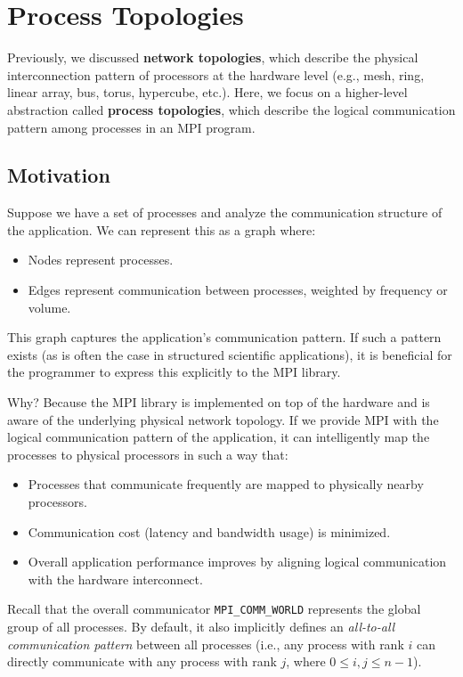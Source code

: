 \documentclass[12pt]{book}
\begin{document}
\section{Process Topologies}

Previously, we discussed \textbf{network topologies}, which describe the physical interconnection pattern of processors at the hardware level (e.g., mesh, ring, linear array, bus, torus, hypercube, etc.).  
Here, we focus on a higher-level abstraction called \textbf{process topologies}, which describe the logical communication pattern among processes in an MPI program.

\subsection{Motivation}
Suppose we have a set of processes and analyze the communication structure of the application. We can represent this as a graph where:
\begin{itemize}
    \item Nodes represent processes.
    \item Edges represent communication between processes, weighted by frequency or volume.
\end{itemize}

This graph captures the application's communication pattern. If such a pattern exists (as is often the case in structured scientific applications), it is beneficial for the programmer to express this explicitly to the MPI library.

Why? Because the MPI library is implemented on top of the hardware and is aware of the underlying physical network topology. If we provide MPI with the logical communication pattern of the application, it can intelligently map the processes to physical processors in such a way that:
\begin{itemize}
    \item Processes that communicate frequently are mapped to physically nearby processors.
    \item Communication cost (latency and bandwidth usage) is minimized.
    \item Overall application performance improves by aligning logical communication with the hardware interconnect.
\end{itemize}

Recall that the overall communicator \texttt{MPI\_COMM\_WORLD} represents the global group of all processes. By default, it also implicitly defines an \emph{all-to-all communication pattern} between all processes (i.e., any process with rank $i$ can directly communicate with any process with rank $j$, where $0 \leq i,j \leq n-1$).
\end{document}
